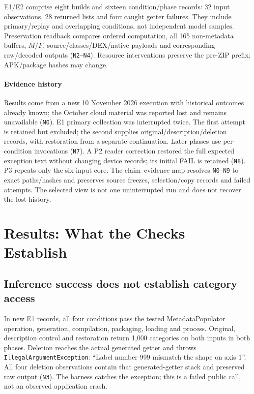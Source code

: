 \documentclass[10pt,conference]{IEEEtran}
\newcommand{\code}[1]{\texttt{#1}}
\begin{document}
E1/E2 comprise eight builds and sixteen condition/phase records: 32 input observations, 28 returned lists and four caught getter failures. They include primary/replay and overlapping conditions, not independent model samples. Preservation readback compares ordered computation, all 165 non-metadata buffers, $M/F$, source/classes/DEX/native payloads and corresponding raw/decoded outputs (\code{N2--N4}). Resource interventions preserve the pre-ZIP prefix; APK/package hashes may change.

\paragraph{Evidence history}
Results come from a new 10 November 2026 execution with historical outcomes already known; the October cloud material was reported lost and remains unavailable (\code{N0}). E1 primary collection was interrupted twice. The first attempt is retained but excluded; the second supplies original/description/deletion records, with restoration from a separate continuation. Later phases use per-condition invocations (\code{N7}). A P2 reader correction restored the full expected exception text without changing device records; its initial FAIL is retained (\code{N8}). P3 repeats only the six-input core. The claim--evidence map resolves \code{N0--N9} to exact paths/hashes and preserves source freezes, selection/copy records and failed attempts. The selected view is not one uninterrupted run and does not recover the lost history.

\section{Results: What the Checks Establish}
\label{sec:results}
\subsection{Inference success does not establish category access}
\label{sec:e1}
In new E1 records, all four conditions pass the tested MetadataPopulator operation, generation, compilation, packaging, loading and process. Original, description control and restoration return 1,000 categories on both inputs in both phases. Deletion reaches the actual generated getter and throws \code{IllegalArgumentException}: ``Label number 999 mismatch the shape on axis 1''. All four deletion observations contain that generated-getter stack and preserved raw output (\code{N3}). The harness catches the exception; this is a failed public call, not an observed application crash.
\end{document}
